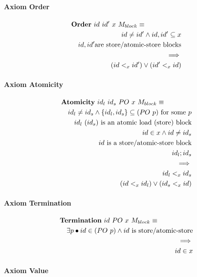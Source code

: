 \paragraph{Axiom Order}

\begin{eqnarray*}
\lefteqn{\mathbf{Order}~id~id'~x~ M_{block} \equiv {}}
\\&& id \neq id' \land {id,id'} \subseteq x
\\&& id,id' \mbox{are store/atomic-store blocks}
\\&& \implies
\\&& (id <_x id') \lor (id' <_x id)
\end{eqnarray*}

\paragraph{Axiom Atomicity}

\begin{eqnarray*}
\lefteqn{\mathbf{Atomicity}~id_l~id_s~PO~x~ M_{block} \equiv {}}
\\&& id_l \neq id_s \land \{id_l,id_s\} \subseteq (PO~p) \textrm{ for some }p
\\&& id_l~(id_s) \textrm{ is an atomic load (store) block}
\\&& id \in x \land id \neq id_s
\\&& id \mbox{ is a store/atomic-store block}
\\&& id_l ; id_s
\\&& \implies
\\&& id_l <_x id_s
\\&& (id <_x id_l) \lor (id_s <_x id)
\end{eqnarray*}

\paragraph{Axiom Termination}

\begin{eqnarray*}
\lefteqn{\mathbf{Termination}~id~PO~x~ M_{block} \equiv {}}
\\&& \exists p \bullet id \in (PO~p)
                       \land id
                       \mbox{ is store/atomic-store}
\\&& \implies
\\&& id \in x
\end{eqnarray*}

\paragraph{Axiom Value}

